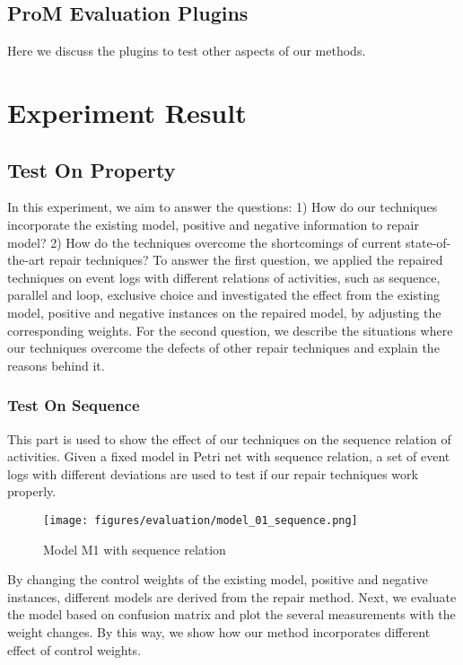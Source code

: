 \subsection{ProM Evaluation Plugins}
Here we discuss the plugins to test other aspects of our methods. 
\section{Experiment Result}
\subsection{Test On Property}
In this experiment, we aim to answer the questions: 1) How do our techniques incorporate the existing model, positive and negative information to repair model? 2) How do the techniques overcome the shortcomings of current state-of-the-art repair techniques?
To answer the first question, we applied the repaired techniques on event logs with different relations of activities, such as sequence, parallel and loop, exclusive choice and investigated the effect from the existing model, positive and negative instances on the repaired model, by adjusting the corresponding weights. For the second question, we describe the situations where our techniques overcome the defects of other repair techniques and explain the reasons behind it. 
\subsubsection{Test On Sequence}
This part is used to show the effect of our techniques on the sequence relation of activities. Given a fixed model in Petri net with sequence relation, a set of event logs with different deviations are used to test if our repair techniques work properly.
\begin{figure}
		\texttt{[image: figures/evaluation/model\_01\_sequence.png]}
	\caption{Model M1 with sequence relation}
	\label{fig:sequence-M1}
\end{figure}
By changing the control weights of the existing model, positive and negative instances, different models are derived from the repair method. Next, we evaluate the model based on confusion matrix and plot the several measurements with the weight changes. By this way, we show how our method incorporates different effect of control weights.

